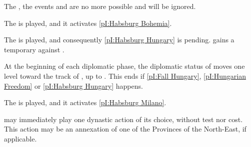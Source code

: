 \effetlong The , the events 
and  are no more possible and will be ignored.






\phevnt
\aparag The  is played, and it activates \ref{pI:Habsburg
  Bohemia}.






\phevnt
\aparag The  is played, and consequently \ref{pI:Habsburg
  Hungary} is pending.
\aparag \POL gains a temporary \CB against \paysHongrie.

\phdipl
\aparag At the beginning of each diplomatic phase, the diplomatic status of
\paysHongrie moves one level toward the track of \HAB, up to \EG. This ends if
\ref{pI:Fall Hungary}, \ref{pI:Hungarian Freedom} or \ref{pI:Habsburg Hungary}
happens.





\aparag The  is played, and it activates \ref{pI:Habsburg
  Milano}.




\phevnt
\aparag \SPA may immediately play one dynastic action of its choice, without
test nor cost.
\bparag This action may be an annexation of one of the Provinces of the
North-East, if applicable.



